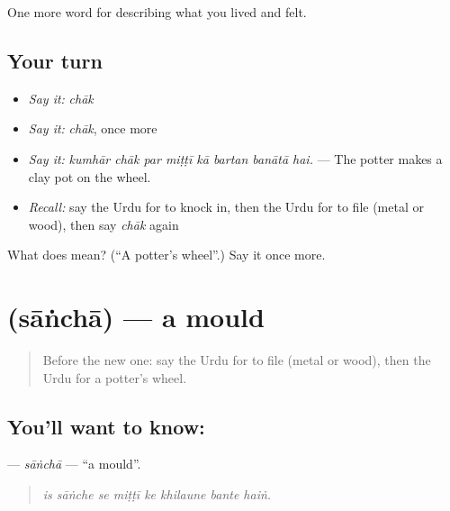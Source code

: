 \begin{grammarlens}[title={What you've built}]
One more word for describing what you lived and felt.
\end{grammarlens}

\subsection*{Your turn}
\begin{itemize}
\raggedright
  \item \emph{Say it:} \emph{chāk}
  \item \emph{Say it:} \emph{chāk}, once more
  \item \emph{Say it:} \emph{kumhār chāk par miṭṭī kā bartan banātā hai.} — The potter makes a clay pot on the wheel.
  \item \emph{Recall:} say the Urdu for to knock in, then the Urdu for to file (metal or wood), then say \emph{chāk} again
\end{itemize}

\begin{tcolorbox}[breakable,colback=teal!4,colframe=teal!35!black,title={Before you move on}]
What does  mean? (\textquotedblleft{}A potter's wheel\textquotedblright{}.) Say it once more.
\end{tcolorbox}
\section[\texorpdfstring{\ur{سانچا} (sāṅchā)}{سانچا (sāṅchā)}]{ (sāṅchā) — a mould}

\label{lesson:UR-C498-sancha}



\begin{quote}
Before the new one: say the Urdu for to file (metal or wood), then the Urdu for a potter's wheel.
\end{quote}

\subsection*{You'll want to know: }
\textbf{} — \emph{sāṅchā} — \textquotedblleft{}a mould\textquotedblright{}.

\begin{quote}
       
\end{quote}

\begin{quote}
\emph{is sāṅche se miṭṭī ke khilaune bante haiṅ.}
\end{quote}

